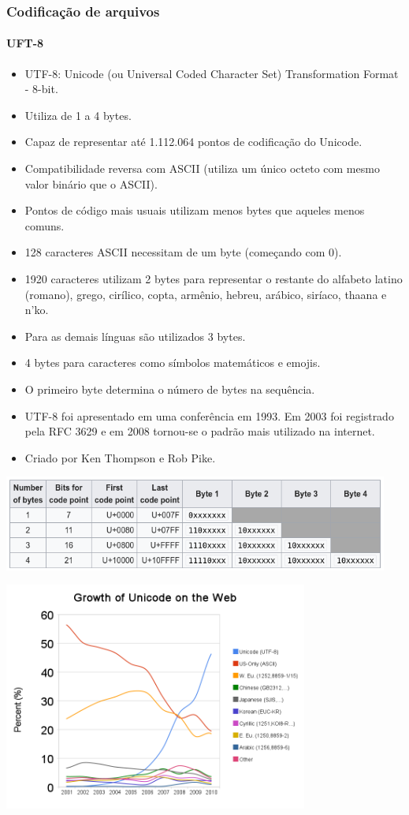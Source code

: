 \begin{frame}[allowframebreaks]
\frametitle{Codificação de arquivos}
\framesubtitle{UFT-8}
  \begin{itemize}
  \item UTF-8: Unicode (ou Universal Coded Character Set) Transformation Format - 8-bit.
  \item Utiliza de 1 a 4 bytes.
  \item Capaz de representar até 1.112.064 pontos de codificação do Unicode.
  \item Compatibilidade reversa com ASCII (utiliza um único octeto com mesmo valor binário que o ASCII).
  \item Pontos de código mais usuais utilizam menos bytes que aqueles menos comuns.
  \item 128 caracteres ASCII necessitam de um byte (começando com 0). 
  \item 1920 caracteres utilizam 2 bytes para representar o restante do alfabeto latino (romano),
        grego, cirílico, copta, armênio, hebreu, arábico, siríaco, thaana e n'ko.
  \item Para as demais línguas são utilizados 3 bytes.
  \item 4 bytes para caracteres como símbolos matemáticos e emojis.
  \item O primeiro byte determina o número de bytes na sequência.
  \item UTF-8 foi apresentado em uma conferência em 1993. Em 2003 foi registrado pela RFC 3629 e 
        em 2008 tornou-se o padrão mais utilizado na internet.
  \item Criado por Ken Thompson e Rob Pike.
  \end{itemize}

  \includegraphics[width=0.95\textwidth]{figures/utf8bytes.png}

  \includegraphics[width=0.75\textwidth]{figures/unicodeweb.png}


\end{frame}
